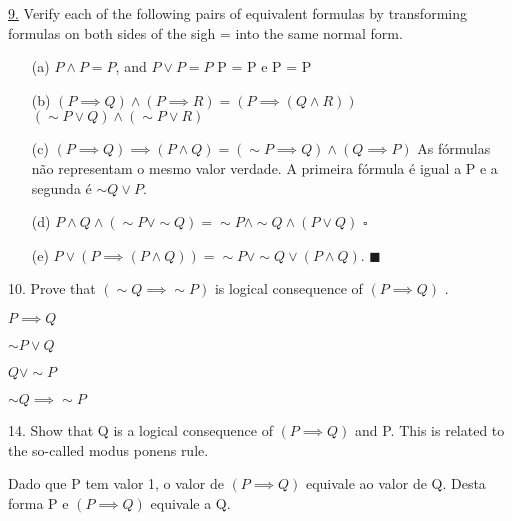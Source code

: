 \underline{9.} Verify each of the following pairs of equivalent formulas by transforming formulas on both sides of the sigh = into the same normal form.
\begin{itemize}
 \item[(a)] $ P \wedge P = P $, and $ P \vee P = P $ \newline
P = P e P = P
 \item[(b)] $ (P \implies Q) \wedge (P \implies R) = (P \implies (Q \wedge R)) $ \newline
$ (\sim P \vee Q) \wedge (\sim P \vee R) $
 \item[(c)] $ (P \implies Q) \implies (P \wedge Q) = (\sim P \implies Q) \wedge (Q \implies P) $ \newline
As fórmulas não representam o mesmo valor verdade. A primeira fórmula é igual a P e a segunda é $ \sim Q \vee P $.
 \item[(d)] $ P \wedge Q \wedge (\sim P \vee \sim Q) = \sim P \wedge \sim Q \wedge (P \vee Q) $ \newline
$ \square $
 \item[(e)] $ P \vee (P \implies (P \wedge Q)) = \sim P \vee \sim Q \vee (P \wedge Q) $. \newline
$ \blacksquare $
\end{itemize}

10. Prove that $ (\sim Q \implies \sim P) $ is logical consequence of $(P \implies Q) $ .

$P \implies Q$

$\sim P \vee Q$

$Q \vee \sim P$

$\sim Q \implies \sim P$

14. Show that Q is a logical consequence of $ (P \implies Q) $ and P. This is related to the so-called modus ponens rule.

Dado que P tem valor 1, o  valor de $ (P \implies Q) $ equivale ao valor de Q. Desta forma P e $ (P \implies Q) $ equivale a Q.
